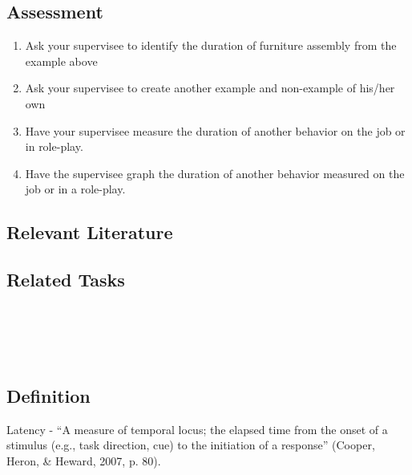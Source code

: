 \subsection{Assessment}
\begin{enumerate}
\item Ask your supervisee to identify the duration of furniture assembly from the example above
\item Ask your supervisee to create another example and non-example of his/her own
\item Have your supervisee measure the duration of another behavior on the job or in role-play.
\item Have the supervisee graph the duration of another behavior measured on the job or in a role-play.
\end{enumerate}
%
\subsection{Relevant Literature}
\begin{refsection}
\nocite{test,alang2017police,clayton2018black}
\printbibliography[heading=none]
\end{refsection}%


\subsection{Related Tasks}
\fourhOne{}\\
\fouriOne{}\\
\fourFKFourtySeven{}\\

%
%
%
%
%
%
%
%
%
\section{\fouraFour{}}
\subsection{Definition}  
Latency - ``A measure of temporal locus; the elapsed time from the onset of a stimulus (e.g., task direction, cue) to the initiation of a response'' (Cooper, Heron, \& Heward, 2007, p. 80).  

